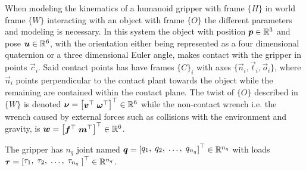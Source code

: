 \begin{center}
\begin{minipage}{.48\linewidth}
    \end{minipage}%
    \vspace{15pt}
    \begin{minipage}[t]{.48\linewidth}
        \vspace{0pt}
        \captionsetup{type=figure}
        \label{fig:friction-contact-distribution}
    \end{minipage}%
    \hfill%
    \begin{minipage}[t]{.48\linewidth}
        \vspace{0pt}
        \captionsetup{type=figure}
        \label{fig:force-closure-model}
    \end{minipage}%
\end{center}

When modeling the kinematics of a humanoid gripper with frame $\{H\}$ in world frame $\{W\}$ interacting with an object with frame $\{O\}$ the different parameters and modeling is necessary. In this system the object with position $\bm{p}\in\mathbb{R}^3$ and pose $\bm{u}\in\mathbb{R}^6$, with the orientation either being represented as a four dimensional quaternion or a three dimensional Euler angle, makes contact with the gripper in points $\vec{c}_i$. Said contact points has have frames $\{C\}_i$ with axes $\{\vec{n}_i,\vec{t}_i,\vec{o}_i\}$, where $\vec{n}_i$ points perpendicular to the contact plant towards the object while the remaining are contained within the contact plane. The twist of $\{O\}$ described in $\{W\}$ is denoted $\vec{\nu} = \rvec{\vec{v}^\T\; \vec{\omega}^\T}^\T\in\R^6 $ while the non-contact wrench i.e. the wrench caused by external forces such as collisions with the environment and gravity, is $\vec{w} = \rvec{\vec{f}^\T\; \vec{m}^\T}^\T\in\R^6$. \medskip

The gripper has $n_q$ joint named $\vec{q} = \rvec{q_1,\; q_2,\; \dots,\; q_{n_q}}^\T\in\R^{n_q}$ with loads $\vec{\tau} = \rvec{\tau_1,\;\tau_2,\;\dots,\;\tau_{n_q}\;}^\T\in\R^{n_q}$.






